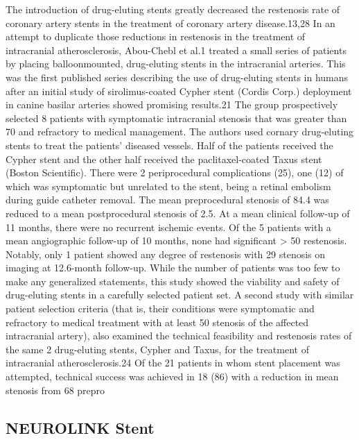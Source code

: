 \documentclass{article}
\begin{document}
The introduction of drug-eluting stents greatly decreased the restenosis rate of coronary artery stents in 
the treatment of coronary artery disease.13,28 In an attempt to duplicate those reductions in restenosis in the 
treatment of intracranial atherosclerosis, Abou-Chebl et 
al.1
 treated a small series of patients by placing balloonmounted, drug-eluting stents in the intracranial arteries. 
This was the first published series describing the use of 
drug-eluting stents in humans after an initial study of 
sirolimus-coated Cypher stent (Cordis Corp.) deployment 
in canine basilar arteries showed promising results.21 The 
group prospectively selected 8 patients with symptomatic 
intracranial stenosis that was greater than 70 and refractory to medical management. The authors used cornary drug-eluting stents to treat the patients’ diseased 
vessels. Half of the patients received the Cypher stent and 
the other half received the paclitaxel-coated Taxus stent 
(Boston Scientific). There were 2 periprocedural complications (25), one (12) of which was symptomatic but 
unrelated to the stent, being a retinal embolism during 
guide catheter removal. The mean preprocedural stenosis 
of 84.4 was reduced to a mean postprocedural stenosis of 2.5. At a mean clinical follow-up of 11 months, 
there were no recurrent ischemic events. Of the 5 patients 
with a mean angiographic follow-up of 10 months, none 
had significant > 50 restenosis. Notably, only 1 patient 
showed any degree of restenosis with 29 stenosis on 
imaging at 12.6-month follow-up. While the number of 
patients was too few to make any generalized statements, 
this study showed the viability and safety of drug-eluting 
stents in a carefully selected patient set.
A second study with similar patient selection criteria 
(that is, their conditions were symptomatic and refractory 
to medical treatment with at least 50 stenosis of the affected intracranial artery), also examined the technical 
feasibility and restenosis rates of the same 2 drug-eluting 
stents, Cypher and Taxus, for the treatment of intracranial 
atherosclerosis.24 Of the 21 patients in whom stent placement was attempted, technical success was achieved in 18 
(86) with a reduction in mean stenosis from 68 prepro
\subsection{NEUROLINK Stent}
\end{document}
